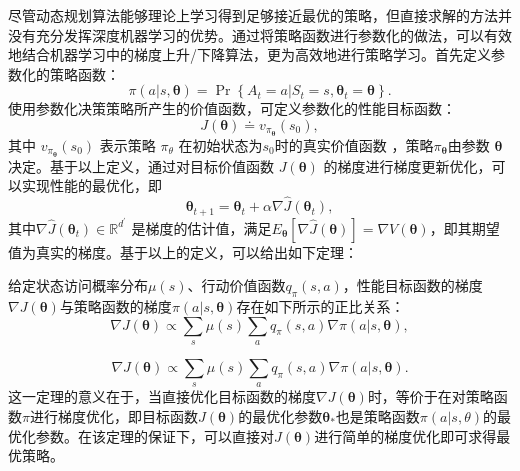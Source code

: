 尽管动态规划算法能够理论上学习得到足够接近最优的策略，但直接求解的方法并没有充分发挥深度机器学习的优势。通过将策略函数进行参数化的做法，可以有效地结合机器学习中的梯度上升/下降算法，更为高效地进行策略学习\cite{sutton1999policy,grondman2012survey}。首先定义参数化的策略函数：
\begin{equation}
\pi ( a | s , \boldsymbol { \theta } ) = \operatorname { Pr } \left\{ A _ { t } = a | S _ { t } = s , \boldsymbol { \theta } _ { t } = \boldsymbol { \theta } \right\}.
\end{equation}
使用参数化决策策略所产生的价值函数，可定义参数化的性能目标函数：
\begin{equation}
    J(\boldsymbol{\theta}) \doteq v_{\pi_{\boldsymbol{\theta}}}\left(s_{0}\right),
\end{equation}
其中 $v_{\pi_{\boldsymbol{\theta}}}\left(s_{0}\right)$ 表示策略 $\pi_\theta$ 在初始状态为$s_0$时的真实价值函数 ，策略$\pi_{\boldsymbol{\theta}}$由参数 $\boldsymbol{\theta}$ 决定。基于以上定义，通过对目标价值函数 $J ( \boldsymbol { \theta } )$ 的梯度进行梯度更新优化，可以实现性能的最优化，即
\begin{equation}
\boldsymbol { \theta } _ { t + 1 } = \boldsymbol { \theta } _ { t } + \alpha \nabla \widehat {  J }\left( \boldsymbol { \theta } _ { t } \right) ,
\end{equation}
其中$\nabla\widehat {  J }\left( \boldsymbol { \theta } _ { t } \right)  \in \mathbb { R } ^ { d ^ { \prime } }$ 是梯度的估计值，满足$E_\boldsymbol{\theta}\left[\nabla\widehat {  J }\left( \boldsymbol { \theta } \right) \right]=\nabla V(\boldsymbol{\theta})$，即其期望值为真实的梯度。基于以上的定义，可以给出如下定理：
\begin{theorem}
给定状态访问概率分布$\mu(s)$、行动价值函数$q_\pi(s,a)$，性能目标函数的梯度$\nabla J(\boldsymbol{\theta})$与策略函数的梯度$\pi(a | s, \boldsymbol{\theta})$存在如下所示的正比关系：
\begin{equation}
    \nabla J(\boldsymbol{\theta}) \propto \sum_{s} \mu(s) \sum_{a} q_{\pi}(s, a) \nabla \pi(a | s, \boldsymbol{\theta}),
\end{equation}
\end{theorem}
\begin{equation}
    \nabla J(\boldsymbol{\theta}) \propto \sum_{s} \mu(s) \sum_{a} q_{\pi}(s, a) \nabla \pi(a | s, \boldsymbol{\theta}).
\end{equation}
这一定理的意义在于，当直接优化目标函数的梯度$\nabla J(\boldsymbol{\theta})$时，等价于在对策略函数$\pi$进行梯度优化，即目标函数$J(\boldsymbol{\theta})$的最优化参数$\boldsymbol{\theta_*}$也是策略函数$\pi(a|s,\theta)$的最优化参数。在该定理的保证下，可以直接对$J(\boldsymbol{\theta})$进行简单的梯度优化即可求得最优策略。


